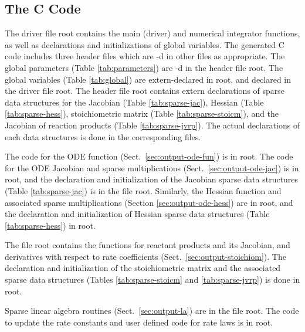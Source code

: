 \documentclass[twoside]{article}
\newcommand{\kpproot}{{\sc root}}
\begin{document}
\subsection{The C Code}
\label{sec:c}

The driver file \kpproot{} contains the main (driver) and
numerical integrator functions, as well as declarations and
initializations of global variables. The generated C code includes three
header files which are -d in other files as appropriate.
The global parameters (Table \ref{tab:parameters}) are -d
in the header file \kpproot{}. The global variables
(Table \ref{tab:global}) are extern-declared in
\kpproot{}, and declared in the driver file
\kpproot{}. The header file \kpproot{} contains
extern declarations of sparse data structures for the Jacobian (Table
\ref{tab:sparse-jac}), Hessian (Table \ref{tab:sparse-hess}),
stoichiometric matrix (Table \ref{tab:sparse-stoicm}), and the Jacobian
of reaction products (Table \ref{tab:sparse-jvrp}). The actual
declarations of each data structures is done in the corresponding files.

The code for the ODE function (Sect.~\ref{sec:output-ode-fun}) is in
\kpproot{}. The code for the ODE Jacobian and sparse
multiplications (Sect.~\ref{sec:output-ode-jac}) is in
\kpproot{}, and the declaration and initialization of
the Jacobian sparse data structures (Table \ref{tab:sparse-jac}) is in
the file \kpproot{}. Similarly, the Hessian
function and associated sparse multiplications (Section
\ref{sec:output-ode-hess}) are in \kpproot{}, and the
declaration and initialization of Hessian sparse data structures (Table
\ref{tab:sparse-hess}) in \kpproot{}.

The file \kpproot{} contains the functions for reactant
products and its Jacobian, and derivatives with respect to rate
coefficients (Sect.~\ref{sec:output-stoichiom}). The declaration and
initialization of the stoichiometric matrix and the associated sparse
data structures (Tables \ref{tab:sparse-stoicm} and
\ref{tab:sparse-jvrp}) is done in \kpproot{}.

Sparse linear algebra routines (Sect.~\ref{sec:output-la}) are in
the file \kpproot{}. The code to update the rate
constants and user defined code for rate laws is in
\kpproot{}.
\end{document}
